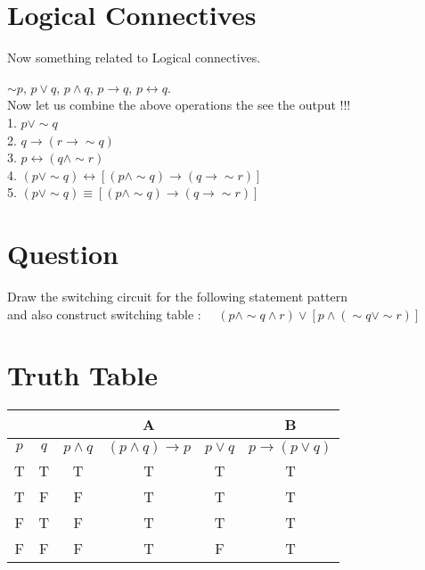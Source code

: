 \documentclass[17pt]{article}
\newcommand{\lto}{\mathbin{\to}}
\begin{document}
\section{Logical Connectives}
Now something related to Logical connectives.

$\sim p$, $p \vee q$, 
$p \wedge q$, $p\to q$, 
$p \leftrightarrow q$. \\
Now let us combine the above operations the see the output !!! \\
1. $p\vee \sim q$ \\
2. $q \to ( r \to \sim q )$ \\
3. $p \leftrightarrow ( q \wedge  \sim r) $ \\
4. $(p \vee \sim q) \leftrightarrow [(p \wedge \sim q) \to (q \to \sim r)] $ \\
5. $(p \vee \sim q) \equiv [(p \wedge \sim q) \to (q \to \sim r)] $


\section{Question}
Draw the switching circuit for the following statement pattern \\ and also construct switching table : \ \  
$(p \wedge \sim q \wedge r ) \vee [ p \wedge ( \sim q \vee \sim r )] $



\section{Truth Table}
\begin{tabular}{|c*{5}{c|}}
\multicolumn{3}{c}{}&
\multicolumn{1}{c}{\textbf{A}}
&\multicolumn{1}{c}{}&
\multicolumn{1}{c}{\textbf{B}} \\
\hline
$p$ & $q$ & $p\land q$ & $(p\land q)\lto p$ & $p\lor q$ & $p\to (p\lor q)$\\
\hline
 T & T & T & T & T & T\\
 T & F & F & T & T & T\\
 F & T & F & T & T & T\\
 F & F & F & T & F & T\\
\hline
\end{tabular}
\end{document}
